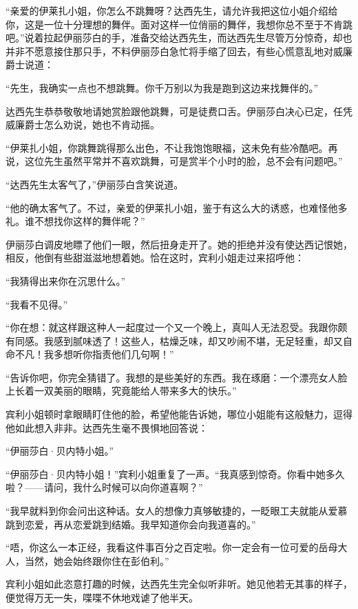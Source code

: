 \par “亲爱的伊莱扎小姐，你怎么不跳舞呀？达西先生，请允许我把这位小姐介绍给你，这是一位十分理想的舞伴。面对这样一位俏丽的舞伴，我想你总不至于不肯跳吧。”说着拉起伊丽莎白的手，准备交给达西先生，而达西先生尽管万分惊奇，却也并非不愿意接住那只手，不料伊丽莎白急忙将手缩了回去，有些心慌意乱地对威廉爵士说道：
\par “先生，我确实一点也不想跳舞。你千万别以为我是跑到这边来找舞伴的。”
\par 达西先生恭恭敬敬地请她赏脸跟他跳舞，可是徒费口舌。伊丽莎白决心已定，任凭威廉爵士怎么劝说，她也不肯动摇。
\par “伊莱扎小姐，你跳舞跳得那么出色，不让我饱饱眼福，这未免有些冷酷吧。再说，这位先生虽然平常并不喜欢跳舞，可是赏半个小时的脸，总不会有问题吧。”
\par “达西先生太客气了，”伊丽莎白含笑说道。
\par “他的确太客气了。不过，亲爱的伊莱扎小姐，鉴于有这么大的诱惑，也难怪他多礼。谁不想找你这样的舞伴呢？”
\par 伊丽莎白调皮地瞟了他们一眼，然后扭身走开了。她的拒绝并没有使达西记恨她，相反，他倒有些甜滋滋地想着她。恰在这时，宾利小姐走过来招呼他：
\par “我猜得出来你在沉思什么。”
\par “我看不见得。”
\par “你在想：就这样跟这种人一起度过一个又一个晚上，真叫人无法忍受。我跟你颇有同感。我感到腻味透了！这些人，枯燥乏味，却又吵闹不堪，无足轻重，却又自命不凡！我多想听你指责他们几句啊！”
\par “告诉你吧，你完全猜错了。我想的是些美好的东西。我在琢磨：一个漂亮女人脸上长着一双美丽的眼睛，究竟能给人带来多大的快乐。”
\par 宾利小姐顿时拿眼睛盯住他的脸，希望他能告诉她，哪位小姐能有这般魅力，逗得他如此想入非非。达西先生毫不畏惧地回答说：
\par “伊丽莎白·贝内特小姐。”
\par “伊丽莎白·贝内特小姐！”宾利小姐重复了一声。“我真感到惊奇。你看中她多久啦？——请问，我什么时候可以向你道喜啊？”
\par “我早就料到你会问出这种话。女人的想像力真够敏捷的，一眨眼工夫就能从爱慕跳到恋爱，再从恋爱跳到结婚。我早知道你会向我道喜的。”
\par “唔，你这么一本正经，我看这件事百分之百定啦。你一定会有一位可爱的岳母大人，当然，她会始终跟你住在彭伯利。”
\par 宾利小姐如此恣意打趣的时候，达西先生完全似听非听。她见他若无其事的样子，便觉得万无一失，喋喋不休地戏谑了他半天。



